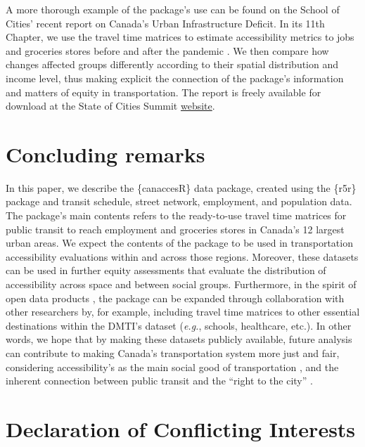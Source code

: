 \documentclass[Royal,times,sageh]{sagej}
\begin{document}
A more thorough example of the package's use can be found on the School
of Cities' recent report on Canada's Urban Infrastructure Deficit. In
its 11th Chapter, we use the travel time matrices to estimate
accessibility metrics to jobs and groceries stores before and after the
pandemic \citep{pargaDemocraticAccessOur2024}. We then compare how
changes affected groups differently according to their spatial
distribution and income level, thus making explicit the connection of
the package's information and matters of equity in transportation. The
report is freely available for download at the State of Cities Summit
\href{https://stateofcitiessummit.ca/report}{website}.

\section{Concluding remarks}\label{concluding-remarks}

In this paper, we describe the \{canaccesR\} data package, created using
the \{r5r\} package and transit schedule, street network, employment,
and population data. The package's main contents refers to the
ready-to-use travel time matrices for public transit to reach employment
and groceries stores in Canada's 12 largest urban areas. We expect the
contents of the package to be used in transportation accessibility
evaluations within and across those regions. Moreover, these datasets
can be used in further equity assessments that evaluate the distribution
of accessibility across space and between social groups. Furthermore, in
the spirit of open data products
\citep{arribas-belOpenDataProductsA2021}, the package can be expanded
through collaboration with other researchers by, for example, including
travel time matrices to other essential destinations within the DMTI's
dataset (\emph{e.g.}, schools, healthcare, etc.). In other words, we
hope that by making these datasets publicly available, future analysis
can contribute to making Canada's transportation system more just and
fair, considering accessibility's as the main social good of
transportation \citep{martensTransportJusticeDesigning2016}, and the
inherent connection between public transit and the ``right to the city''
\citep{cogginRightTransportMoving2015}.

\section{Declaration of Conflicting
Interests}\label{declaration-of-conflicting-interests}
\end{document}
